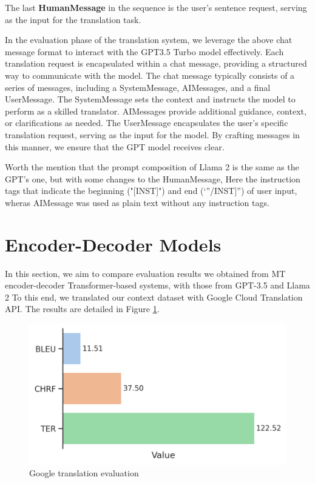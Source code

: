 \documentclass[twocolumn]{article}
\begin{document}
The last \textbf{HumanMessage} in the sequence is the user’s sentence request, serving as the input for the translation task.


In the evaluation phase of the translation system, we leverage the above chat message format to interact with the GPT3.5 Turbo model effectively. Each translation request is encapsulated within a chat message, providing a structured way to communicate with the model. The chat message typically consists of a series of messages, including a SystemMessage, AIMessages, and a final UserMessage. The SystemMessage sets the context and instructs the model to perform as a skilled translator. AIMessages provide additional guidance, context, or clarifications as needed. The UserMessage encapsulates the user’s specific translation request, serving as the input for the model. By crafting messages in this manner, we ensure that the GPT model receives clear.

Worth the mention that the prompt composition of Llama 2 is the same as the GPT's one, but with some changes to the HumanMessage, Here the instruction tags that indicate the beginning ("[INST]") and end (`”/INST]”) of user input, wheras AIMessage was used as plain text without any instruction tags.


\section{Encoder-Decoder Models}
In this section, we aim to compare evaluation
results we obtained from MT encoder-decoder Transformer-based systems\cite{vaswani2017attention}, with those from GPT-3.5 and Llama 2 To this end, we translated our context dataset with Google Cloud Translation API. The results are detailed in Figure \ref{fig:google_transltation_evaluation}.

\begin{figure}
	\centering
	\includegraphics[width=\linewidth, ]{figs/Google_translate_api} %
	\caption{ Google translation evaluation}
	
	\label{fig:google_transltation_evaluation}
\end{figure}
\end{document}
